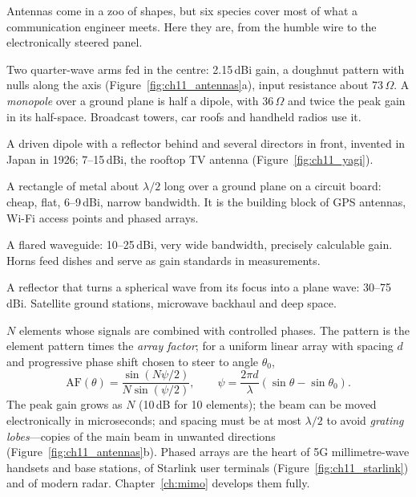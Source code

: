 Antennas come in a zoo of shapes, but six species cover most of what a communication engineer
meets. Here they are, from the humble wire to the electronically steered panel.

\begin{description}[style=unboxed,leftmargin=0pt]
\item[The half-wave dipole.] Two quarter-wave arms fed in the centre: 2.15\,dBi gain, a doughnut
pattern with nulls along the axis (Figure~\ref{fig:ch11_antennas}a), input resistance about
73\,$\Omega$. A \emph{monopole} over a ground plane is half a dipole, with 36\,$\Omega$ and
twice the peak gain in its half-space. Broadcast towers, car roofs and handheld radios use it.
\item[The Yagi--Uda array.] A driven dipole with a reflector behind and several directors in
front, invented in Japan in 1926; 7--15\,dBi, the rooftop TV antenna
(Figure~\ref{fig:ch11_yagi}).
\item[The patch.] A rectangle of metal about $\lambda/2$ long over a ground plane on a circuit
board: cheap, flat, 6--9\,dBi, narrow bandwidth. It is the building block of GPS antennas,
Wi-Fi access points and phased arrays.
\item[The horn.] A flared waveguide: 10--25\,dBi, very wide bandwidth, precisely calculable
gain. Horns feed dishes and serve as gain standards in measurements.
\item[The parabolic dish.] A reflector that turns a spherical wave from its focus into a plane
wave: 30--75\,dBi. Satellite ground stations, microwave backhaul and deep space.
\item[The phased array.] $N$ elements whose signals are combined with controlled phases. The
pattern is the element pattern times the \emph{array factor}; for a uniform linear array with
spacing $d$ and progressive phase shift chosen to steer to angle $\theta_0$,
\begin{equation}
\mathrm{AF}(\theta)=\frac{\sin(N\psi/2)}{N\sin(\psi/2)},\qquad
\psi=\frac{2\pi d}{\lambda}(\sin\theta-\sin\theta_0).
\end{equation}
The peak gain grows as $N$ (10\,dB for 10 elements); the beam can be moved electronically in
microseconds; and spacing must be at most $\lambda/2$ to avoid \emph{grating lobes}---copies
of the main beam in unwanted directions (Figure~\ref{fig:ch11_antennas}b). Phased arrays are
the heart of 5G millimetre-wave handsets and base stations, of Starlink user terminals
(Figure~\ref{fig:ch11_starlink}) and of modern radar. Chapter~\ref{ch:mimo} develops them fully.
\end{description}

